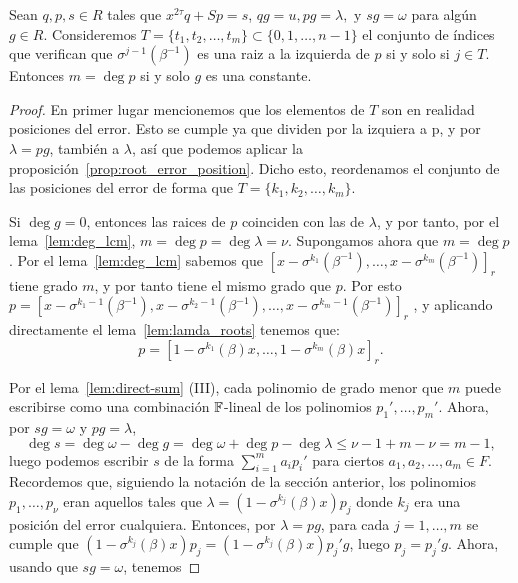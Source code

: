 \begin{theorem}
    Sean \(q, p, s \in R\)  tales que \(x^{2\tau}q + Sp = s\),  \(qg = u, pg = \lambda, \text{ y  } sg = \omega\) para algún \(g \in R\). Consideremos \(T = \{t_1, t_2, \ldots, t_{m}\} \subset \{0,1, \ldots, n-1\}\) el conjunto de índices que verifican que \(\sigma^{j-1}(\beta^{-1})\) es una raiz a la izquierda de \(p\) si y solo si  \(j \in T\). Entonces \(m = \deg p \) si y solo \(g\) es una constante.
\end{theorem}

\begin{proof}
    En primer lugar mencionemos que los elementos de \(T\) son en realidad posiciones del error. Esto se cumple ya que dividen por la izquiera a p, y por \(\lambda = pg\), también a \(\lambda\), así que podemos aplicar la proposición~\ref{prop:root_error_position}. Dicho esto, reordenamos el conjunto de las posiciones del error de forma que \(T = \{k_1, k_2, \ldots, k_m\}\).

    Si \(\deg g = 0\), entonces las raices de \(p\) coinciden con las de  \(\lambda\), y por tanto, por el lema~\ref{lem:deg_lcm}, \(m = \deg p = \deg \lambda = \nu\). Supongamos ahora que \(m = \deg p\). Por el lema~\ref{lem:deg_lcm} sabemos que \( [x - \sigma^{k_1}(\beta^{-1}), \ldots, x - \sigma^{k_m}(\beta^{-1})]_r \) tiene grado \(m\), y por tanto tiene el mismo grado que \(p\). Por esto
\(
p = [x - \sigma^{k_1-1}(\beta^{-1}), x - \sigma^{k_2-1}(\beta^{-1}), \dots, x - \sigma^{k_m-1}(\beta^{-1})]_r
\)
, y aplicando directamente el lema~\ref{lem:lamda_roots} tenemos que:
    \[
    p = {[1 - \sigma^{k_1}(\beta)x, \ldots, 1 - \sigma^{k_m}(\beta)x]}_{r}
    .\]

Por el lema~\ref{lem:direct-sum} (III), cada polinomio de grado menor que \(m\) puede escribirse como una combinación  \(\mathbb{F}\)-lineal de los polinomios  \(p_1', \ldots, p_m'\). Ahora, por \(sg = \omega\) y \(pg = \lambda\),
\[
\deg s = \deg \omega - \deg g = \deg \omega + \deg p - \deg \lambda \le \nu -1 + m - \nu = m-1
,\]
luego podemos escribir \(s\) de la forma \(\sum_{i=1}^{m} a_ip_i'\) para ciertos \(a_1, a_2, \ldots, a_m \in F\). Recordemos que, siguiendo la notación de la sección anterior, los polinomios \(p_1, \ldots, p_\nu\) eran aquellos tales que \(\lambda = (1 - \sigma^{k_j}(\beta)x)p_j\) donde \(k_j\) era una posición del error cualquiera. Entonces, por \(\lambda = pg\), para cada \(j = 1, \ldots, m\) se cumple que \((1 - \sigma ^{k_j}(\beta)x)p_j = (1 - \sigma^{k_j}(\beta)x)p_j'g\), luego \(p_j = p_j'g\). Ahora, usando que \(sg = \omega\), tenemos


\end{proof}
